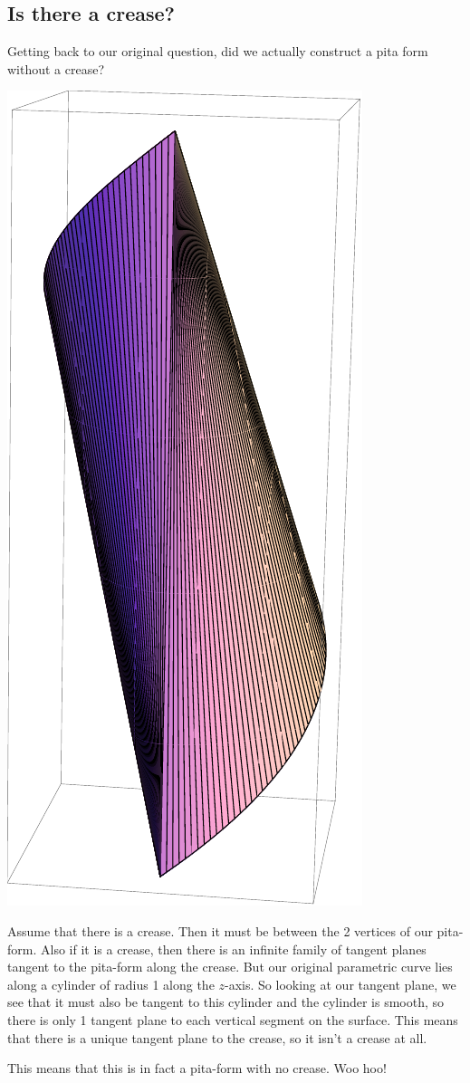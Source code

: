 \documentclass[12pt]{article}
\begin{document}
\subsection{Is there a crease?}
Getting back to our original question, did we actually construct a pita form without a crease?
\begin{center}
\includegraphics[scale=.6]{crease_h=5_n=150.pdf}
\end{center}
Assume that there is a crease. Then it must be between the 2 vertices of our pita-form. Also if it is a crease, then there is an infinite family of tangent planes tangent to the pita-form along the crease. But our original parametric curve lies along a cylinder of radius 1 along the $z$-axis. So looking at our tangent plane, we see that it must also be tangent to this cylinder and the cylinder is smooth, so there is only 1 tangent plane to each vertical segment on the surface. This means that there is a unique tangent plane to the crease, so it isn't a crease at all. 

This means that this is in fact a pita-form with no crease. Woo hoo!
\end{document}
